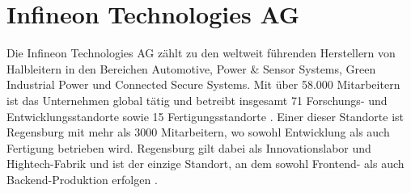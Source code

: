 \section{Infineon Technologies AG}

Die Infineon Technologies AG zählt zu den weltweit führenden Herstellern von Halbleitern in den Bereichen Automotive, Power \& Sensor Systems, Green Industrial Power und Connected Secure Systems. Mit über 58.000 Mitarbeitern ist das Unternehmen global tätig und betreibt insgesamt 71 Forschungs- und Entwicklungsstandorte sowie 15 Fertigungsstandorte \cite{infineon2024unternehmenspraesentation}. Einer dieser Standorte ist Regensburg mit mehr als 3000 Mitarbeitern, wo sowohl Entwicklung als auch Fertigung betrieben wird. Regensburg gilt dabei als Innovationslabor und Hightech-Fabrik und ist der einzige Standort, an dem sowohl Frontend- als auch Backend-Produktion erfolgen \cite{infineon2024regensburg}.
